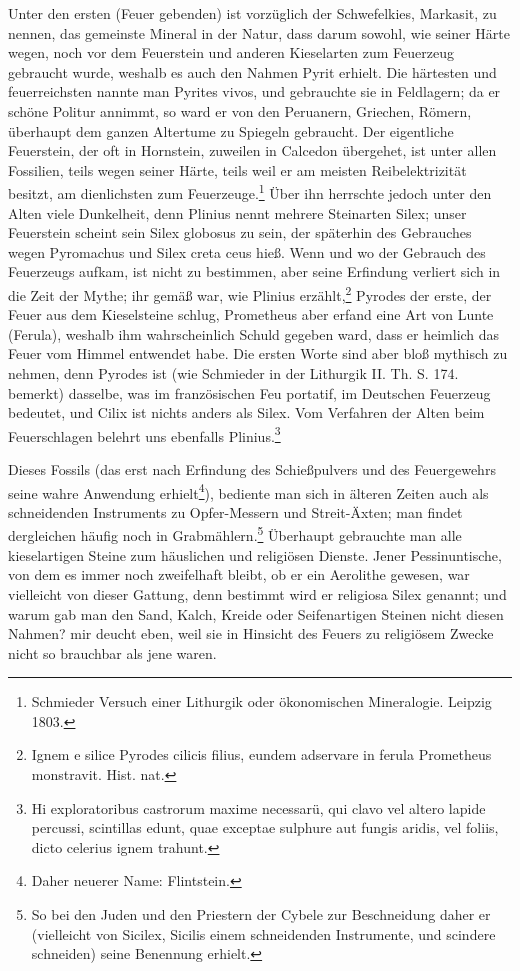 \documentclass[a4paper, 11pt, oneside, polutonikogreek, german]{article}
\begin{document}
Unter den ersten (Feuer gebenden) ist vorzüglich der Schwefelkies, Markasit, zu nennen, das gemeinste Mineral in der Natur, dass darum sowohl, wie seiner Härte wegen, noch vor dem Feuerstein und anderen Kieselarten zum Feuerzeug gebraucht wurde, weshalb es auch den Nahmen Pyrit erhielt. Die härtesten und feuerreichsten nannte man Pyrites vivos, und gebrauchte sie in Feldlagern; da er schöne Politur annimmt, so ward er von den Peruanern, Griechen, Römern, überhaupt dem ganzen Altertume zu Spiegeln gebraucht. Der eigentliche Feuerstein, der oft in Hornstein, zuweilen in Calcedon übergehet, ist unter allen Fossilien, teils wegen seiner Härte, teils weil er am meisten Reibelektrizität besitzt, am dienlichsten zum Feuerzeuge.\footnote{Schmieder Versuch einer Lithurgik oder ökonomischen Mineralogie. Leipzig 1803.} Über ihn herrschte jedoch unter den Alten viele Dunkelheit, denn Plinius nennt mehrere Steinarten Silex; unser Feuerstein scheint sein Silex globosus zu sein, der späterhin des Gebrauches wegen Pyromachus und Silex creta ceus hieß. Wenn und wo der Gebrauch des Feuerzeugs aufkam, ist nicht zu bestimmen, aber seine Erfindung verliert sich in die Zeit der Mythe; ihr gemäß war, wie Plinius erzählt,\footnote{Ignem e silice Pyrodes cilicis filius, eundem adservare in ferula Prometheus monstravit. Hist. nat.} Pyrodes der erste, der Feuer aus dem Kieselsteine schlug, Prometheus aber erfand eine Art von Lunte (Ferula), weshalb ihm wahrscheinlich Schuld gegeben ward, dass er heimlich das Feuer vom Himmel entwendet habe. Die ersten Worte sind aber bloß mythisch zu nehmen, denn Pyrodes ist (wie Schmieder in der Lithurgik II. Th. S. 174. bemerkt) dasselbe, was im französischen Feu portatif, im Deutschen Feuerzeug bedeutet, und Cilix ist nichts anders als Silex. Vom Verfahren der Alten beim Feuerschlagen belehrt uns ebenfalls Plinius.\footnote{Hi exploratoribus castrorum maxime necessarü, qui clavo vel altero lapide percussi, scintillas edunt, quae exceptae sulphure aut fungis aridis, vel foliis, dicto celerius ignem trahunt.}

Dieses Fossils (das erst nach Erfindung des Schießpulvers und des Feuergewehrs seine wahre Anwendung erhielt\footnote{Daher neuerer Name: Flintstein.}), bediente man sich in älteren Zeiten auch als schneidenden Instruments zu Opfer-Messern und Streit-Äxten; man findet dergleichen häufig noch in Grabmählern.\footnote{So bei den Juden und den Priestern der Cybele zur Beschneidung daher er (vielleicht von Sicilex, Sicilis einem schneidenden Instrumente, und scindere schneiden) seine Benennung erhielt.} Überhaupt gebrauchte man alle kieselartigen Steine zum häuslichen und religiösen Dienste. Jener Pessinuntische, von dem es immer noch zweifelhaft bleibt, ob er ein Aerolithe gewesen, war vielleicht von dieser Gattung, denn bestimmt wird er religiosa Silex genannt; und warum gab man den Sand, Kalch, Kreide oder Seifenartigen Steinen nicht diesen Nahmen? mir deucht eben, weil sie in Hinsicht des Feuers zu religiösem Zwecke nicht so brauchbar als jene waren.
\end{document}
